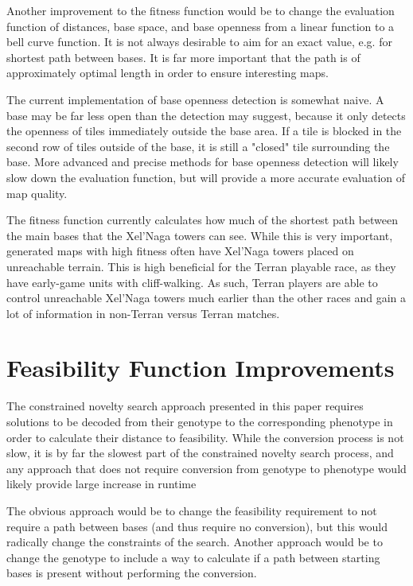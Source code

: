 Another improvement to the fitness function would be to change the evaluation function of distances, base space, and base openness from a linear function to a bell curve function. It is not always desirable to aim for an exact value, e.g. for shortest path between bases. It is far more important that the path is of approximately optimal length in order to ensure interesting maps.

The current implementation of base openness detection is somewhat naive. A base may be far less open than the detection may suggest, because it only detects the openness of tiles immediately outside the base area. If a tile is blocked in the second row of tiles outside of the base, it is still a "closed" tile surrounding the base. More advanced and precise methods for base openness detection will likely slow down the evaluation function, but will provide a more accurate evaluation of map quality.

The fitness function currently calculates how much of the shortest path between the main bases that the Xel'Naga towers can see. While this is very important, generated maps with high fitness often have Xel'Naga towers placed on unreachable terrain. This is high beneficial for the Terran playable race, as they have early-game units with cliff-walking. As such, Terran players are able to control unreachable Xel'Naga towers much earlier than the other races and gain a lot of information in non-Terran versus Terran matches.

\section{Feasibility Function Improvements}
\label{futurework_feasibility}
The constrained novelty search approach presented in this paper requires solutions to be decoded from their genotype to the corresponding phenotype in order to calculate their distance to feasibility. While the conversion process is not slow, it is by far the slowest part of the constrained novelty search process, and any approach that does not require conversion from genotype to phenotype would likely provide large increase in runtime 

The obvious approach would be to change the feasibility requirement to not require a path between bases (and thus require no conversion), but this would radically change the constraints of the search. Another approach would be to change the genotype to include a way to calculate if a path between starting bases is present without performing the conversion.
